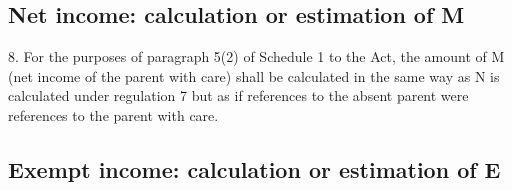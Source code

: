 \documentclass[12pt,a4paper]{article}
\begin{document}

\subsection[8. Net income: calculation or estimation of M]{Net income: calculation or estimation of M}

8.  For the purposes of paragraph 5(2) of Schedule 1 to the Act, the amount of M (net income of the parent with care) shall be calculated in the same way as N is calculated under regulation 7 but as if references to the absent parent were references to the parent with care.

\subsection[9. Exempt income: calculation or estimation of E]{Exempt income: calculation or estimation of E}
\end{document}
